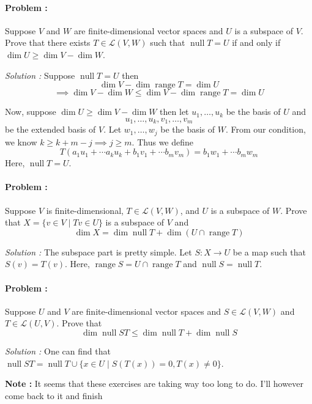 \paragraph{Problem :} Suppose $V$ and $W$ are finite-dimensional vector spaces and $U$ is a subspace of $V$. Prove that there exists 
$T \in \mathcal{L}(V,W)$ such that $\operatorname{null} T = U$ if and only if $\dim U \ge \dim V - \dim W$.

\vspace{4mm}
\textit{Solution :} Suppose $\operatorname{null} T = U$ then 
\[ \dim V - \dim \operatorname{range} T = \dim U \]
\[ \implies \dim V - \dim W \le \dim V - \dim \operatorname{range} T = \dim U\]

Now, suppose $\dim U \ge \dim V - \dim W$ then let $u_1 , \ldots, u_k$ be the basis of $U$ and 
\[ u_1, \ldots, u_k, v_1, \ldots, v_m \] 
be the extended basis of $V$. Let $w_1, \ldots, w_j$ be the basis of $W$. From our condition, we know $k \ge k+m-j \implies j \ge m$. 
Thus we define
\[ T(a_1 u_1 + \cdots a_k u_k + b_1 v_1 + \cdots b_m v_m) = b_1 w_1 + \cdots b_m w_m \]
Here, $\operatorname{null} T = U$.


\paragraph{Problem :} Suppose $V$ is finite-dimensional, $T \in \mathcal{L}(V,W)$, and $U$ is a subspace of $W$. Prove that 
$X = \{ v \in V \mid Tv \in U\}$ is a subspace of $V$ and
\[ \dim X = \dim \operatorname{null} T + \dim (U \cap \operatorname{range} T ) \]

\vspace{4mm}
\textit{Solution :} The subspace part is pretty simple. Let $S : X \to U$ be a map such that $S(v)=T(v)$. Here,
$\operatorname{range} S = U \cap \operatorname{range} T$ and $\operatorname{null} S = \operatorname{null} T$.

\paragraph{Problem :} Suppose $U$ and $V$ are finite-dimensional vector spaces and $S \in \mathcal{L}(V,W)$ and $T \in \mathcal{L}(U,V)$. 
Prove that
\[ \dim \operatorname{null} ST \le \dim \operatorname{null} T + \dim \operatorname{null} S \]

\vspace{4mm}
\textit{Solution :} One can find that $\operatorname{null} ST = \operatorname{null} T \cup \{x \in U \mid S(T(x))=0 , T(x) \neq 0 \}$. 


\vspace{9mm}
\textbf{Note :} It seems that these exercises are taking way too long to do. I'll however come back to it and finish